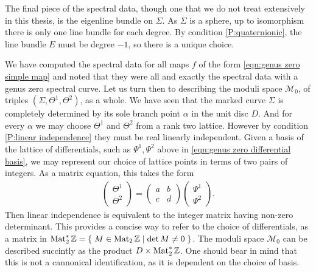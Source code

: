 The final piece of the spectral data, though one that we do not treat extensively in this thesis, is the eigenline bundle on $Σ$. As $Σ$ is a sphere, up to isomorphism there is only one line bundle for each degree. By condition \ref{P:quaternionic}, the line bundle $E$ must be degree $-1$, so there is a unique choice.





We have computed the spectral data for all maps $f$ of the form \eqref{eqn:genus zero simple map} and noted that they were all and exactly the spectral data with a genus zero spectral curve. Let us turn then to describing the moduli space $\mathcal{M}_0$, of triples $(Σ,Θ^1,Θ^2)$, as a whole. We have seen that the marked curve $Σ$ is completely determined by its sole branch point $α$ in the unit disc $D$. And for every $α$ we may choose $Θ^1$ and $Θ^2$ from a rank two lattice. However by condition \ref{P:linear independence} they must be real linearly independent. Given a basis of the lattice of differentials, such as $Ψ^1, Ψ^2$ above in \eqref{eqn:genus zero differential basis}, we may represent our choice of lattice points in terms of two pairs of integers. As a matrix equation, this takes the form
\begin{align*}
\begin{pmatrix}
Θ^1 \\ Θ^2
\end{pmatrix}
=
\begin{pmatrix}
a & b \\
c & d
\end{pmatrix}
\begin{pmatrix}
Ψ^1 \\ Ψ^2
\end{pmatrix}.
\end{align*}
Then linear independence is equivalent to the integer matrix having non-zero determinant. This provides a concise way to refer to the choice of differentials, as a matrix in $\operatorname{Mat}_2^*\mathbb{Z} = \left\{\;  M \in \operatorname{Mat}_2\mathbb{Z}  \;\middle|\; \det M \neq 0 \;\right\}$. The moduli space $\mathcal{M}_0$ can be described succintly as the product $D \times \operatorname{Mat}_2^*\mathbb{Z}$. One should bear in mind that this is not a cannonical identification, as it is dependent on the choice of basis.

